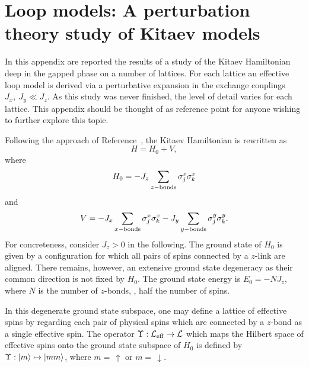 \chapter{Loop models: A perturbation theory study of Kitaev models}
\label{appendix:LoopModels}

\newcommand{\note}[1]{\textbf{#1}}

%
%
In this appendix are reported the results of a study of the Kitaev Hamiltonian deep in the gapped phase on a number of lattices.
For each lattice an effective loop model is derived via a perturbative expansion in the exchange couplings $J_x,~J_y \ll J_z$.
As this study was never finished, the level of detail varies for each lattice.
This appendix should be thought of as reference point for anyone wishing to further explore this topic.

Following the approach of Reference~\cite{KitaevAoP2006}, the Kitaev Hamiltonian is rewritten as
%
\begin{equation}
	H = H_0 + V,
\end{equation}
%
where
%
\begin{equation}
	H_0 = -J_z \sum_{z \rm-bonds} \sigma_j^z \sigma_k^z
\end{equation}
%
and
%
\begin{equation}
	V = -J_x \sum_{x \rm-bonds} \sigma_j^x \sigma_k^x - J_y \sum_{y \rm-bonds} \sigma_j^y \sigma_k^y.
	\label{eq:appendix1_PotentialTerm}
\end{equation}
%
For concreteness, consider $J_z > 0$ in the following.
The ground state of $H_0$ is given by a configuration for which all pairs of spins connected by a $z$-link are aligned.
There remains, however, an extensive ground state degeneracy as their common direction is not fixed by $H_0$.
The ground state energy is $E_0 = -N J_z$, where $N$ is the number of $z$-bonds, \ie, half the number of spins.

In this degenerate ground state subspace, one may define a lattice of effective spins by regarding each pair of physical spins which are connected by a $z$-bond as a single effective spin.
The operator $\Upsilon:\mathcal{L}_{\rm eff} \rightarrow \mathcal{L}$ which maps the Hilbert space of effective spins onto the ground state subspace of $H_0$ is defined by $\Upsilon:| m \rangle \mapsto | m m \rangle$, where $m =\, \uparrow$ or $m =\, \downarrow$.

